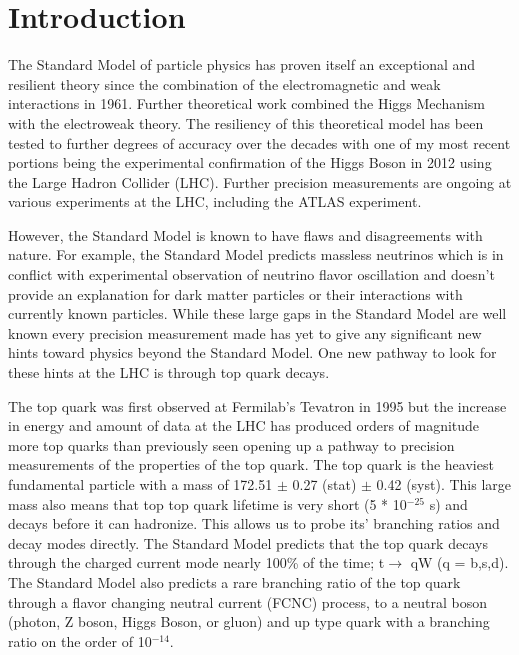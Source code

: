 \newpage
\section{Introduction}
\label{sec:intro}

The Standard Model of particle physics has proven itself an exceptional and resilient theory since the combination of the electromagnetic and weak interactions in 1961\cite{SM1Glashow}.  Further theoretical work combined the Higgs Mechanism\cite{Higgs1,Higgs2} with the electroweak theory\cite{SM2Weinberg, SM3Salam}.  The resiliency of this theoretical model has been tested to further degrees of accuracy over the decades with one of my most recent portions being the experimental confirmation of the Higgs Boson in 2012\cite{Higgs3,Higgs4} using the Large Hadron Collider (LHC).  Further precision measurements are ongoing at various experiments at the LHC, including the ATLAS experiment.

However, the Standard Model is known to have flaws and disagreements with nature.  For example, the Standard Model predicts massless neutrinos which is in conflict with experimental observation of neutrino flavor oscillation and doesn't provide an explanation for dark matter particles or their interactions with currently known particles.  While these large gaps in the Standard Model are well known every precision measurement made has yet to give any significant new hints toward physics beyond the Standard Model.  One new pathway to look for these hints at the LHC is through top quark decays.

The top quark was first observed at Fermilab's Tevatron in 1995\cite{TopObs} but the increase in energy and amount of data at the LHC has produced orders of magnitude more top quarks than previously seen opening up a pathway to precision measurements of the properties of the top quark.  The top quark is the heaviest fundamental particle with a mass of 172.51 $\pm$ 0.27 (stat) $\pm$ 0.42 (syst)\cite{TopMass2017}.  This large mass also means that top top quark lifetime is very short (5 * 10$^{-25}$ s) and decays before it can hadronize.  This allows us to probe its' branching ratios and decay modes directly.  The Standard Model predicts that the top quark decays through the charged current mode nearly 100\% of the time; t$\rightarrow$ qW (q = b,s,d)\cite{PDG2018}.   The Standard Model also predicts a rare branching ratio of the top quark through a flavor changing neutral current (FCNC) process, to a neutral boson (photon, Z boson, Higgs Boson, or gluon) and up type quark with a branching ratio on the order of 10$^{-14}$.

